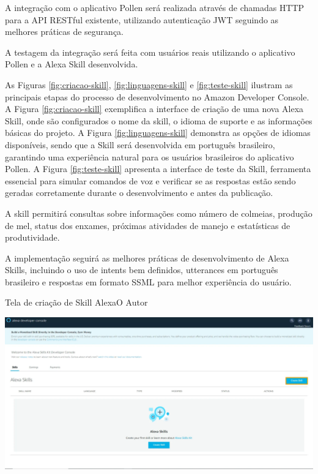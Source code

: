 A integração com o aplicativo Pollen será realizada através de chamadas HTTP para a API RESTful existente, utilizando autenticação JWT seguindo as melhores práticas de segurança. 

A testagem da integração será feita com usuários reais utilizando o aplicativo Pollen e a Alexa Skill desenvolvida.

As Figuras \ref{fig:criacao-skill}, \ref{fig:linguagens-skill} e \ref{fig:teste-skill} ilustram as principais etapas do processo de desenvolvimento no Amazon Developer Console. A Figura \ref{fig:criacao-skill} exemplifica a interface de criação de uma nova Alexa Skill, onde são configurados o nome da skill, o idioma de suporte e as informações básicas do projeto. A Figura \ref{fig:linguagens-skill} demonstra as opções de idiomas disponíveis, sendo que a Skill será desenvolvida em português brasileiro, garantindo uma experiência natural para os usuários brasileiros do aplicativo Pollen. A Figura \ref{fig:teste-skill} apresenta a interface de teste da Skill, ferramenta essencial para simular comandos de voz e verificar se as respostas estão sendo geradas corretamente durante o desenvolvimento e antes da publicação.

A skill permitirá consultas sobre informações como número de colmeias, produção de mel, status dos enxames, próximas atividades de manejo e estatísticas de produtividade.

A implementação seguirá as melhores práticas de desenvolvimento de Alexa Skills, incluindo o uso de intents bem definidos, utterances em português brasileiro e respostas em formato SSML para melhor experiência do usuário.

\begin{figura}{Tela de criação de Skill Alexa}{O Autor}
    \begin{flushleft}
        \label{fig:criacao-skill}
        \includegraphics[width=0.85\linewidth]{resources/floats/ilustracoes/tela_criacao_skill_alexa.png}
    \end{flushleft}
\end{figura}

